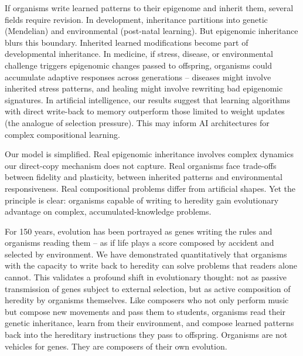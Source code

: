 \documentclass[twocolumn]{nature}
\begin{document}
If organisms write learned patterns to their epigenome and inherit them, several fields require revision. In development, inheritance partitions into genetic (Mendelian) and environmental (post-natal learning). But epigenomic inheritance blurs this boundary\cite{JablonkaLamb2014}. Inherited learned modifications become part of developmental inheritance. In medicine, if stress, disease, or environmental challenge triggers epigenomic changes passed to offspring, organisms could accumulate adaptive responses across generations -- diseases might involve inherited stress patterns, and healing might involve rewriting bad epigenomic signatures. In artificial intelligence, our results suggest that learning algorithms with direct write-back to memory outperform those limited to weight updates (the analogue of selection pressure). This may inform AI architectures for complex compositional learning.

Our model is simplified. Real epigenomic inheritance involves complex dynamics our direct-copy mechanism does not capture\cite{Gibney2010}. Real organisms face trade-offs between fidelity and plasticity, between inherited patterns and environmental responsiveness\cite{Fusco2010}. Real compositional problems differ from artificial shapes. Yet the principle is clear: organisms capable of writing to heredity gain evolutionary advantage on complex, accumulated-knowledge problems.

For 150 years, evolution has been portrayed as genes writing the rules and organisms reading them -- as if life plays a score composed by accident and selected by environment. We have demonstrated quantitatively that organisms with the capacity to write back to heredity can solve problems that readers alone cannot. This validates a profound shift in evolutionary thought: not as passive transmission of genes subject to external selection, but as active composition of heredity by organisms themselves. Like composers who not only perform music but compose new movements and pass them to students, organisms read their genetic inheritance, learn from their environment, and compose learned patterns back into the hereditary instructions they pass to offspring. Organisms are not vehicles for genes. They are composers of their own evolution.

\end{document}

